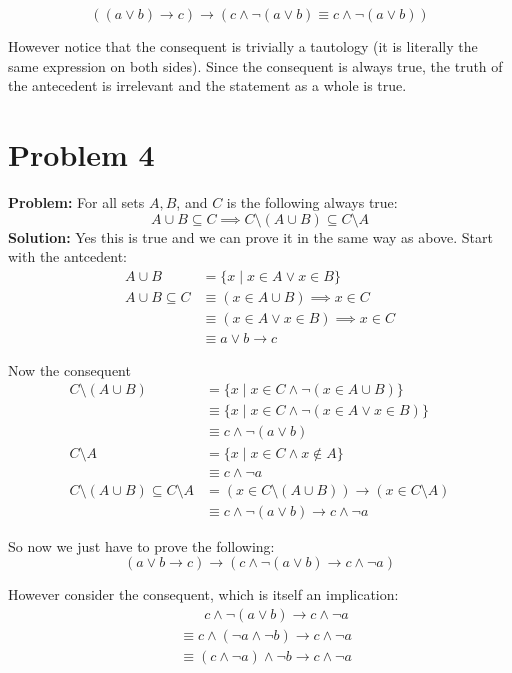 \documentclass{article}
\begin{document}
$$((a \vee b)\rightarrow c)\rightarrow (c\wedge\neg(a \vee b)\equiv c\wedge\neg (a\vee b))$$

However notice that the consequent is trivially a tautology (it is literally the same expression on both sides). Since the consequent is always true, the truth of the antecedent is irrelevant and the statement as a whole is true.

\section*{Problem 4}
\textbf{Problem:} For all sets $A,B$, and $C$ is the following always true:
$$A\cup B\subseteq C\implies C\setminus(A\cup B)\subseteq C\setminus A$$
\textbf{Solution:} Yes this is true and we can prove it in the same way as above. Start with the antcedent:
\begin{align*}
  A\cup B &= \{x\mid x\in A \vee x\in B\}\\
  A\cup B\subseteq C&\equiv (x\in A\cup B)\implies x\in C\\
  &\equiv (x\in A \vee x\in B)\implies x\in C\\
  &\equiv a\vee b\rightarrow c
\end{align*}

Now the consequent
\begin{align*}
  C\setminus(A\cup B)&= \{x\mid x\in C\wedge \neg(x\in A\cup B)\}\\
  &\equiv \{x\mid x\in C\wedge \neg(x\in A \vee x\in B)\}\\
  &\equiv c\wedge \neg(a\vee b)\\
  C\setminus A&=\{x\mid x\in C\wedge x\not\in A\}\\
  &\equiv c \wedge \neg a\\
  C\setminus(A\cup B)\subseteq C\setminus A &= (x\in C\setminus(A\cup B))\rightarrow (x\in C\setminus A)\\
  &\equiv c\wedge \neg(a\vee b)\rightarrow c\wedge\neg a
\end{align*}

So now we just have to prove the following:
$$(a\vee b\rightarrow c)\rightarrow (c\wedge \neg(a\vee b)\rightarrow c\wedge\neg a)$$

However consider the consequent, which is itself an implication:
\begin{align*}
  &\phantom{\equiv\ \ } c\wedge \neg(a\vee b)\rightarrow c\wedge\neg a\\
  &\equiv c\wedge (\neg a\wedge \neg b) \rightarrow c\wedge\neg a\tag{De Morgan's law}\\
  &\equiv (c\wedge \neg a)\wedge \neg b \rightarrow c\wedge\neg a\tag{associative property}\\
\end{align*}
\end{document}
